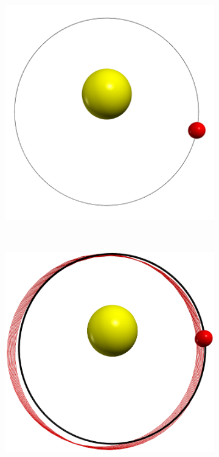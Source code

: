 \documentclass[12pt,ngerman,american]{iopart}
\begin{document}
\begin{figure}[htb]
	\centering
	\begin{subfigure}[c]{0.22\textwidth}
		\includegraphics[width=\textwidth]{figs/a0T5dt20.png}
		\caption{\label{fig:MercuryOrbit-a0-small}}
	\end{subfigure}
	~
	\begin{subfigure}[c]{0.22\textwidth}
		\includegraphics[width=\textwidth]{figs/num-err.png}

\end{subfigure}
\end{figure}
\end{document}
